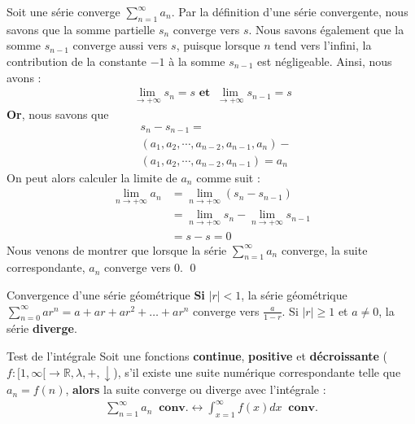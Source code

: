 \documentclass[16pt]{report}
\begin{document}
\begin{multicols*}{2}
    \begin{Preuve}{}{}
        Soit une série converge $\sum_{n=1}^{\infty}a_n$. 
        Par la définition d'une série 
        convergente, nous savons que la somme partielle 
        $s_n$ converge vers $s$. Nous savons
        également que la somme $s_{n-1}$ converge aussi vers $s$, 
        puisque lorsque $n$ tend vers 
        l'infini, la contribution de la constante $-1$ à la somme $s_{n-1}$ 
        est négligeable.
        Ainsi, nous avons :
        \begin{align*}
                \lim\limits_{\to+\infty }s_n  = s \textbf{ et }
                \lim\limits_{\to+\infty }s_{n-1}  = s
        \end{align*}
        \textbf{Or}, nous savons que 
        \begin{align*}
        & s_n - s_{n-1} = \\ 
        & (a_1, a_2, \cdots , a_{n-2}, a_{n-1}, a_n) - \\
        & (a_1, a_2, \cdots, a_{n-2}, a_{n-1}) = a_n
        \end{align*}
    On peut alors calculer la limite de $a_n$ comme suit : 
    \begin{align*}
        \lim\limits_{n\to+\infty}a_n & = \lim\limits_{n\to+\infty}(s_n - s_{n-1})  \\   
                             & = \lim\limits_{n\to+\infty}s_n 
                             - \lim\limits_{n\to+\infty}s_{n-1} \\ 
                             & = s - s = 0
    \end{align*}                
    Nous venons de montrer que lorsque la série 
    $\sum_{n=1}^{\infty}a_n$ converge, la suite correspondante, $a_n$ 
    converge vers 0. \qed
    \end{Preuve}

    \begin{Theorem}{Convergence d'une série géométrique}{}
        \textbf{Si} $|r| < 1$, la série géométrique 
        $\sum_{n=0}^{\infty}ar^{n} = a + ar + ar^2 + \dots + ar^n$ 
        converge vers $ \frac{a}{1 - r}$. Si 
        $|r| \geq 1$ et $a \neq 0$, la série \textbf{diverge}.   
    \end{Theorem}

    \begin{Theorem}{Test de l'intégrale}{}
        Soit une fonctions \textbf{continue}, \textbf{positive} et 
        \textbf{décroissante} 
        ($f: [1, \infty[ \rightarrow \mathbb{R}, \lambda , + , \downarrow$), s'il existe 
        une suite numérique correspondante telle que $a_n = f(n)$, \textbf{alors} 
        la suite converge ou diverge avec l'intégrale : 
        \begin{align*}
                \sum_{n=1}^{\infty }a_n \;\; \textbf{conv.} 
                \leftrightarrow 
                \int_{x=1}^{\infty}f(x)dx \;\; \textbf{conv.}  
        \end{align*}
    \end{Theorem}



\end{multicols*}
\end{document}
